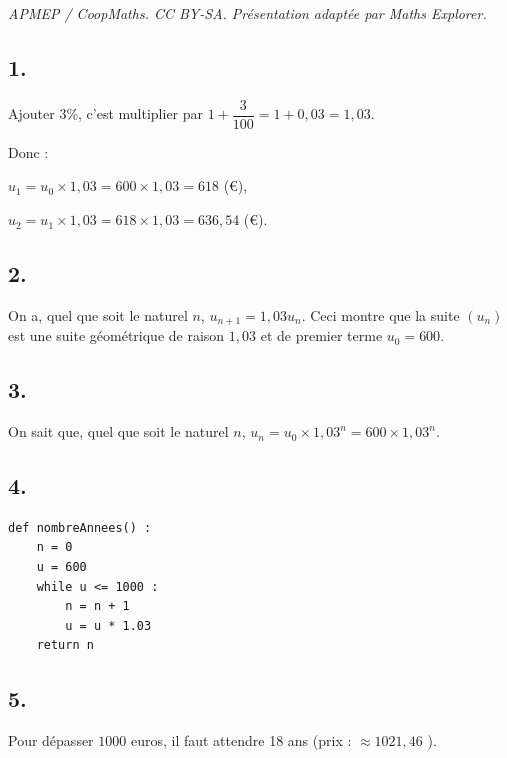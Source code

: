 \documentclass[10pt]{article}
\begin{document}
\noindent\textit{APMEP / CoopMaths. CC BY-SA. Présentation adaptée par Maths Explorer.}\par\medskip
\subsection*{1.}

Ajouter 3\%, c'est multiplier par \(1 + \dfrac{3}{100} = 1 + 0,03 = 1,03\).

Donc :

\(u_1 = u_0 \times 1,03 = 600 \times 1,03 = 618\) (€),

\(u_2 = u_1 \times 1,03 = 618 \times 1,03 = 636,54\) (€).

\subsection*{2.}

On a, quel que soit le naturel \(n\), \(u_{n+1} = 1,03 u_n\). Ceci montre que la suite \((u_n)\) est une suite géométrique de raison \(1,03\) et de premier terme \(u_0 = 600\).

\subsection*{3.}

On sait que, quel que soit le naturel \(n\), \(u_n = u_0 \times 1,03^n = 600 \times 1,03^n\).

\subsection*{4.}

\begin{lstlisting}[style=python]
def nombreAnnees() :
	n = 0
	u = 600
	while u <= 1000 :
		n = n + 1
		u = u * 1.03
	return n
\end{lstlisting}

\subsection*{5.}

Pour dépasser \(1000\) euros, il faut attendre 18 ans (prix : \(\approx 1021,46\) ).
\end{document}
